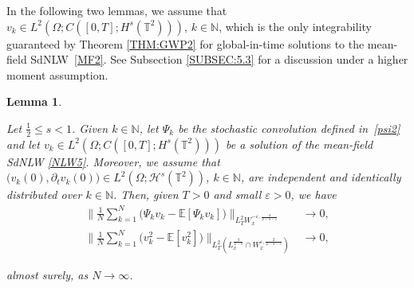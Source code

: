 \documentclass[letterpaper, 11pt,  reqno]{amsart}
\newtheorem{lemma}[theorem]{Lemma}
\newcommand{\1}{\hspace{0.5mm}\text{I}\hspace{0.2mm}}
\newcommand{\noi}{\noindent}
\newcommand{\T}{\mathbb{T}}
\newcommand{\N}{\mathbb{N}}
\newcommand{\E}{\mathbb{E}}
\renewcommand{\H}{\mathcal{H}}
\newcommand{\eps}{\varepsilon}
\newcommand{\dt}{\partial_t}
\numberwithin{equation}{section}
\numberwithin{theorem}{section}
\begin{document}
In the following two lemmas, 
we assume that 
$v_k \in L^{2} (\Omega; C([0, T]; H^{s} (\T^2)))$, $k \in \N$,
which is the only integrability
guaranteed by Theorem \ref{THM:GWP2}
for global-in-time solutions to the mean-field SdNLW~\eqref{MF2}.
See Subsection \ref{SUBSEC:5.3}
for a discussion under
a higher moment assumption.








\begin{lemma}
\label{LEM:LLN2}

Let $\frac 12 \le s < 1$.
Given $k \in \N$, 
let  $\Psi_k$ be the stochastic convolution defined in~\eqref{psi2} 
and let $v_k \in L^{2} (\Omega; C([0, T]; H^{s} (\T^2)))$ be a solution of the mean-field SdNLW \eqref{NLW5}.
Moreover, we assume that $\big(v_k(0), \dt v_k(0)\big)
\in L^{2} (\Omega; \H^s (\T^2))$, $k \in \N$, 
are independent and identically distributed over $k \in \N$.
Then, given $T > 0$
and small $\eps > 0$, 
we have 
\begin{align}
\bigg\| \frac{1}{N} \sum_{k = 1}^N 
\Big( \Psi_k v_k - \E [\Psi_k v_k] \Big) \bigg\|_{L_T^2
W^{-\eps, \frac 4{2- s - \eps}}_x} 
& \longrightarrow 0, 
\label{LNy2} \\
\bigg\| \frac{1}{N} \sum_{k = 1}^N
\Big( v_k^2 - \E [v_k^2] \Big) \bigg\|_{L_T^2 (L^\frac 3{2-s}_x
\cap W_x^{\eps, \frac 2{2-s-\eps}})
} & \longrightarrow 0, 
\label{LNy3} 
\end{align}


\noi
almost surely, as
 $N \to \infty$.


\end{lemma}
\end{document}
